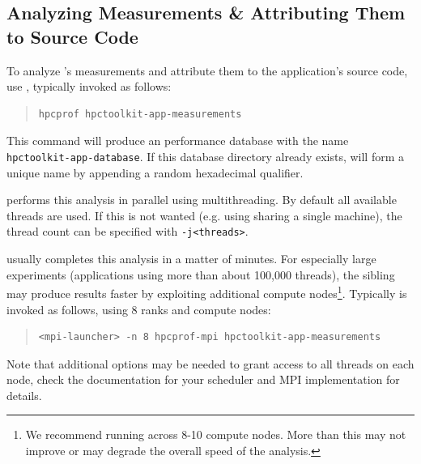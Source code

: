 \documentclass[11pt,twoside,letterpaper]{report}
\begin{document}

\subsection{Analyzing Measurements \& Attributing Them to Source Code}

To analyze \HPCToolkit{}'s measurements and attribute them to the application's source code, use \hpcprof{}, typically invoked as follows:
\begin{quote}
\begin{verbatim}
hpcprof hpctoolkit-app-measurements
\end{verbatim}
\end{quote}

This command will produce an \HPCToolkit{} performance database with the name \texttt{hpctoolkit-app-database}.
If this database directory already exists, \hpcprof{} will form a unique name by appending a random hexadecimal qualifier.

\hpcprof{} performs this analysis in parallel using multithreading.
By default all available threads are used.
If this is not wanted (e.g. using sharing a single machine), the thread count can be specified with \texttt{-j<threads>}.

\hpcprof{} usually completes this analysis in a matter of minutes.
For especially large experiments (applications using more than about 100,000 threads), the sibling \hpcprofmpi{} may produce results faster by exploiting additional compute nodes\footnote{
We recommend running \hpcprofmpi{} across 8-10 compute nodes. More than this may not improve or may degrade the overall speed of the analysis.
}.
Typically \hpcprofmpi{} is invoked as follows, using 8 ranks and compute nodes:
\begin{quote}
\begin{verbatim}
<mpi-launcher> -n 8 hpcprof-mpi hpctoolkit-app-measurements
\end{verbatim}
\end{quote}
Note that additional options may be needed to grant \hpcprofmpi{} access to all threads on each node, check the documentation for your scheduler and MPI implementation for details.
\end{document}
